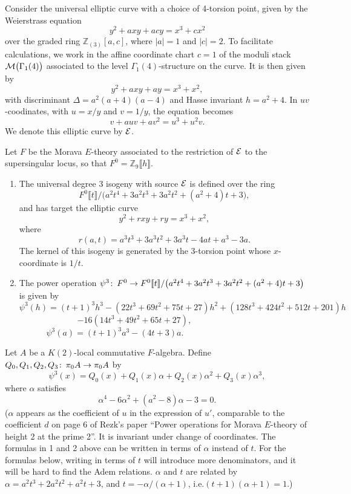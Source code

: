 \documentclass[12pt]{article}
\theoremstyle{definition}
\theoremstyle{remark}
\def\co{\colon\thinspace}
\newcommand{\mb}[1]{\mathbb{#1}}
\begin{document}
Consider the universal elliptic curve with a choice of 4-torsion point, given 
by the Weierstrass equation 
\[
 y^2 + a x y + a c y = x^3 + c x^2 
\]
over the graded ring ${\mb Z}_{(3)}[a,c]$, where $|a| = 1$ and $|c| = 2$.  To 
facilitate calculations, we work in the affine coordinate chart $c = 1$ of the 
moduli stack ${\cal M}\big(\Gamma_1(4)\big)$ associated to the level 
$\Gamma_1(4)$-structure on the curve. It is then given by 
\[
 y^2 + a x y + a y = x^3 + x^2, 
\]
with discriminant $\Delta = a^2(a + 4)(a - 4)$ and Hasse invariant 
$h = a^2 + 4$.  In $uv$-coodinates, with $u = x/y$ and $v = 1/y$, the 
equation becomes 
\[
 v + a u v + a v^2 = u^3 + u^2 v.  
\]
We denote this elliptic curve by $\cal E$.  

Let $F$ be the Morava $E$-theory associated to the restriction of $\cal E$ to 
the supersingular locus, so that $F^0 = {\mb Z}_9 \llbracket h \rrbracket$.  

\begin{enumerate}
 \item The universal degree 3 isogeny with source $\cal E$ is defined over 
 the ring 
 \[
  F^0 \llbracket t \rrbracket / 
  \big(a^2 t^4 + 3 a^2 t^3 + 3 a^2 t^2 + (a^2 + 4) t + 3\big), 
 \]
 and has target the elliptic curve 
 \[
  y^2 + r x y + r y = x^3 + x^2, 
 \]
 where 
 \[
  r(a,t) = a^3 t^3 + 3 a^3 t^2 + 3 a^3 t - 4 a t + a^3 - 3 a.  
 \]
 The kernel of this isogeny is generated by the 3-torsion point whose 
 $x$-coordinate is $1/t$.  
 \item The power operation $\psi^3\co F^0  \to F^0 \llbracket t \rrbracket / 
 \big(a^2 t^4 + 3 a^2 t^3 + 3 a^2 t^2 + (a^2 + 4) t + 3\big)$ is given by 
 \[
  \psi^3(h) = (t + 1)^3 h^3 - (22 t^3 + 69 t^2 + 75 t + 27) h^2 + (128 t^3 + 
  424 t^2 + 512 t + 201) h 
 \]
 \[
  - 16 (14 t^3 + 49 t^2 + 65 t + 27), 
  ~~~~~~~~~~~~~~~~~~~~~~~~~~~~~~~~ 
 \]
 \[
  \psi^3(a) = (t + 1)^3 a^3 - (4 t + 3) a.  
  ~~~~~~~~~~~~~~~~~~~~~~~~~~~~~~~~~~~~~~~~~~~~~~~~~~~~~ 
 \]
\end{enumerate}

Let $A$ be a $K(2)$-local commutative $F$-algebra.  Define 
$Q_0, Q_1, Q_2, Q_3\co\pi_0A \to \pi_0A$ by 
\[
 \psi^3 (x) = Q_0(x) + Q_1(x) \alpha + Q_2(x) \alpha^2 +Q_3(x) \alpha^3, 
\]
where $\alpha$ satisfies 
\[
 \alpha^4 - 6\alpha^2 + (a^2-8)\alpha-3 = 0.  
\]
($\alpha$ appears as the coefficient of $u$ in the expression of $u'$, 
comparable to the coefficient $d$ on page 6 of Rezk's paper ``Power operations for 
Morava $E$-theory of height 2 at the prime 2''.  It is invariant under change 
of coordinates.  The formulas in 1 and 2 above can be written in terms of 
$\alpha$ instead of $t$.  For the formulas below, writing in terms of $t$ 
will introduce more denominators, and it will be hard to find the Adem 
relations.  $\alpha$ and $t$ are related by $\alpha = a^2 t^3 + 2 a^2 t^2 + a^2 t + 3$, and $t = -\alpha/(\alpha + 1)$, i.e.\thinspace$(t + 1) (\alpha + 1) = 1$.)
\end{document}
